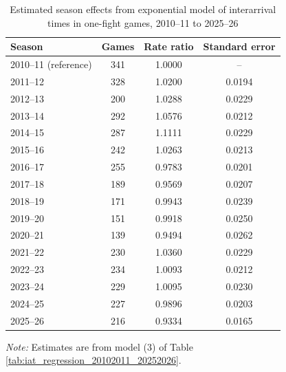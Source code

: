 \begin{table}[!h]
\centering
\caption{Estimated season effects from exponential model of interarrival times in one-fight games, 2010--11 to 2025--26}
\label{tab:season_effects_20102011_20252026}
\small
\renewcommand{\arraystretch}{1.12}
\setlength{\tabcolsep}{6pt}

\begin{tabular*}{0.75\textwidth}{@{\extracolsep{\fill}}lccc}
\toprule
Season & Games & Rate ratio & Standard error \\
\midrule
2010--11 (reference) & 341 & 1.0000 & -- \\
2011--12 & 328 & 1.0200 & 0.0194 \\
2012--13 & 200 & 1.0288 & 0.0229 \\
2013--14 & 292 & 1.0576 & 0.0212 \\
2014--15 & 287 & 1.1111 & 0.0229 \\
2015--16 & 242 & 1.0263 & 0.0213 \\
2016--17 & 255 & 0.9783 & 0.0201 \\
2017--18 & 189 & 0.9569 & 0.0207 \\
2018--19 & 171 & 0.9943 & 0.0239 \\
2019--20 & 151 & 0.9918 & 0.0250 \\
2020--21 & 139 & 0.9494 & 0.0262 \\
2021--22 & 230 & 1.0360 & 0.0229 \\
2022--23 & 234 & 1.0093 & 0.0212 \\
2023--24 & 229 & 1.0095 & 0.0230 \\
2024--25 & 227 & 0.9896 & 0.0203 \\
2025--26 & 216 & 0.9334 & 0.0165 \\
\bottomrule
\end{tabular*}

\vspace{0.4em}
\parbox{0.75\textwidth}{
\footnotesize
\textit{Note:} Estimates are from model (3) of Table \ref{tab:iat_regression_20102011_20252026}.
}
\end{table}
